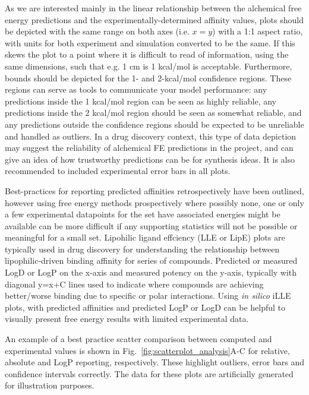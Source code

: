\documentclass[9pt,bestpractices,pubversion]{livecoms}
\begin{document}
As we are interested mainly in the linear relationship between the alchemical free energy predictions and the experimentally-determined affinity values, plots should be depicted with the same range on both axes (i.e. $x=y$) with a 1:1 aspect ratio, with units for both experiment and simulation converted to be the same. If this skews the plot to a point where it is difficult to read of information, using the same dimensions, such that e.g. 1 cm is 1 kcal/mol is acceptable. Furthermore, bounds should be depicted for the 1- and 2-kcal/mol confidence regions. These regions can serve as tools to communicate your model performance: any predictions inside the 1 kcal/mol region can be seen as highly reliable, any predictions inside the 2 kcal/mol region should be seen as somewhat reliable, and any predictions outside the confidence regions should be expected to be unreliable and handled as outliers. In a drug discovery context, this type of data depiction may suggest the reliability of alchemical FE predictions in the project, and can give an idea of how trustworthy predictions can be for synthesis ideas. It is also recommended to included experimental error bars in all plots. 

Best-practices for reporting predicted affinities retrospectively have been outlined, however using free energy methods prospectively where possibly none, one or only a few experimental datapoints for the set have associated energies might be available can be more difficult if any supporting statistics will not be possible or meaningful for a small set. Lipohilic ligand effciency (LLE or LipE) plots are typically used in drug discovery for understanding the relationship between lipophilic-driven binding affinity for series of compounds. Predicted or measured LogD or LogP on the x-axis and measured potency on the y-axis, typically with diagonal y=x+C lines used to indicate where compounds are achieving better/worse binding due to specific or polar interactions. Using \textit{in silico} iLLE plots, with predicted affinities and predicted LogP or LogD can be helpful to visually present free energy results with limited experimental data.

An example of a best practice scatter comparison between computed and experimental values is shown in Fig.~\ref{fig:scatterplot_analysis}A-C for relative, absolute and LogP reporting, respectively. These highlight outliers, error bars and confidence intervals correctly. The data for these plots are artificially generated for illustration purposes.
\end{document}
